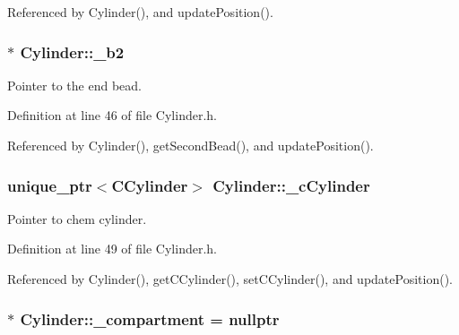 Referenced by Cylinder(), and update\+Position().

\hypertarget{classCylinder_a10fe1bbf3340a35637e4a966c1035af6}{
\subsubsection[{\+\_\+b2}]{$\ast$ Cylinder\+::\+\_\+b2\hspace{0.3cm}{\ttfamily [private]}}}\label{classCylinder_a10fe1bbf3340a35637e4a966c1035af6}


Pointer to the end bead. 



Definition at line 46 of file Cylinder.\+h.



Referenced by Cylinder(), get\+Second\+Bead(), and update\+Position().

\hypertarget{classCylinder_aacbbbcef8a8a2b6e5810884b017af516}{
\subsubsection[{\+\_\+c\+Cylinder}]{\setlength{\rightskip}{0pt plus 5cm}unique\+\_\+ptr$<${\bf C\+Cylinder}$>$ Cylinder\+::\+\_\+c\+Cylinder\hspace{0.3cm}{\ttfamily [private]}}}\label{classCylinder_aacbbbcef8a8a2b6e5810884b017af516}


Pointer to chem cylinder. 



Definition at line 49 of file Cylinder.\+h.



Referenced by Cylinder(), get\+C\+Cylinder(), set\+C\+Cylinder(), and update\+Position().

\hypertarget{classCylinder_a2d8861ef62351377c0f6f7ab583cf8d5}{
\subsubsection[{\+\_\+compartment}]{$\ast$ Cylinder\+::\+\_\+compartment = nullptr\hspace{0.3cm}{\ttfamily [private]}}}\label{classCylinder_a2d8861ef62351377c0f6f7ab583cf8d5}


